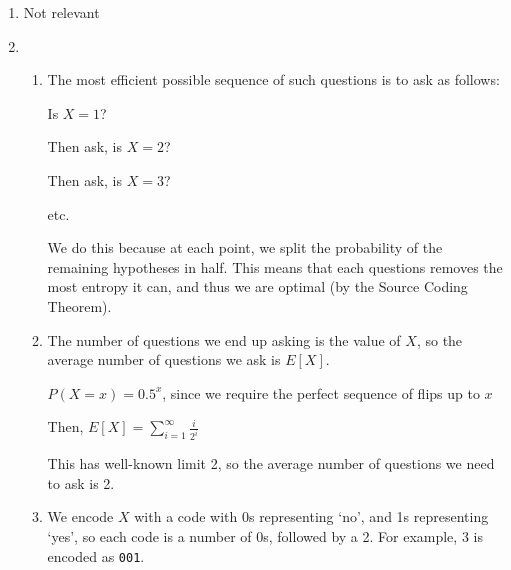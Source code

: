


\begin{enumerate}[label=(\alph*)]
  \item
    Not relevant

  \item
    \begin{enumerate}[label=(\roman*)]
      \item

        The most efficient possible sequence of such questions is to ask as follows:

        Is $X=1$?

        Then ask, is $X=2$?

        Then ask, is $X=3$?

        etc.

        We do this because at each point, we split the probability of the remaining hypotheses in half. This means that each questions removes the most entropy it can, and thus we are optimal (by the Source Coding Theorem).

      \item

        The number of questions we end up asking is the value of $X$, so the average number of questions we ask is $E[X]$.

        $P(X=x) = 0.5^x$, since we require the perfect sequence of flips up to $x$

        Then, $E[X] = \sum_{i=1}^\infty \frac{i}{2^i}$

        This has well-known limit 2, so the average number of questions we need to ask is 2.

      \item
        We encode $X$ with a code with 0s representing `no', and 1s representing `yes', so each code is a number of 0s, followed by a 2. For example, 3 is encoded as \texttt{001}.



        
    \end{enumerate}
        
\end{enumerate}

